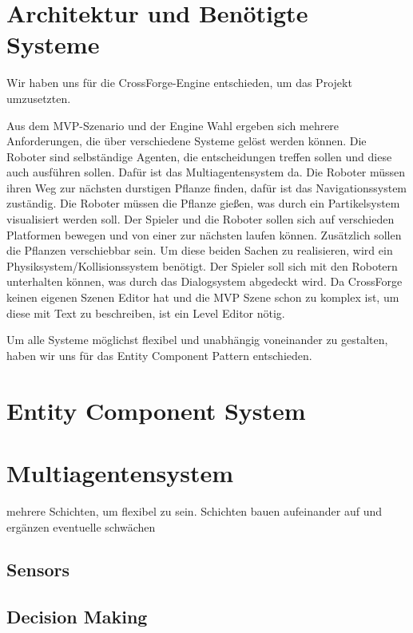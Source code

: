 
\section{Architektur und Benötigte Systeme}

Wir haben uns für die CrossForge-Engine entschieden, um das Projekt umzusetzten.

Aus dem MVP-Szenario und der Engine Wahl ergeben sich mehrere Anforderungen, die über verschiedene Systeme gelöst werden können. Die Roboter sind selbständige Agenten, die entscheidungen treffen sollen und diese auch ausführen sollen. Dafür ist das Multiagentensystem da. Die Roboter müssen ihren Weg zur nächsten durstigen Pflanze finden, dafür ist das Navigationssystem zuständig. Die Roboter müssen die Pflanze gießen, was durch ein Partikelsystem visualisiert werden soll. Der Spieler und die Roboter sollen sich auf verschieden Platformen bewegen und von einer zur nächsten laufen können. Zusätzlich sollen die Pflanzen verschiebbar sein. Um diese beiden Sachen zu realisieren, wird ein Physiksystem/Kollisionssystem benötigt.
Der Spieler soll sich mit den Robotern unterhalten können, was durch das Dialogsystem abgedeckt wird.
Da CrossForge keinen eigenen Szenen Editor hat und die MVP Szene schon zu komplex ist, um diese mit Text zu beschreiben, ist ein Level Editor nötig.

Um alle Systeme möglichst flexibel und unabhängig voneinander zu gestalten, haben wir uns für das Entity Component Pattern entschieden.

\section{Entity Component System}

\section{Multiagentensystem}

mehrere Schichten, um flexibel zu sein. Schichten bauen aufeinander auf und ergänzen eventuelle schwächen

\subsection{Sensors}

\subsection{Decision Making}
